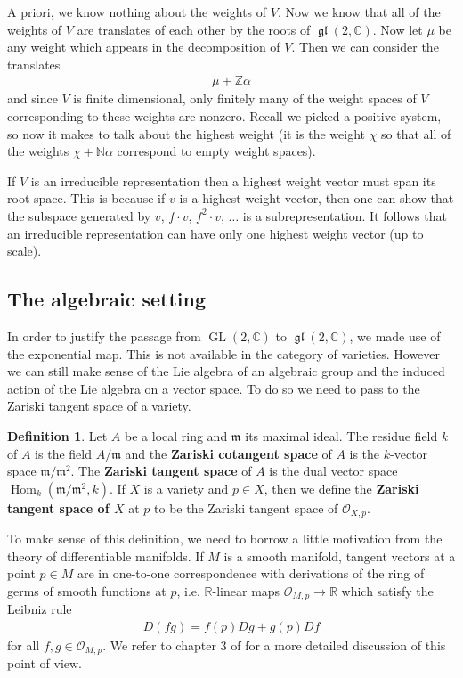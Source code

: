\documentclass{amsart}
\newcommand{\cO}{{\mathcal{O}}}
\DeclareMathOperator{\Hom}{Hom}
\DeclareMathOperator{\GL}{GL}
\newcommand{\C}{\mathbb{C}}
\newcommand{\N}{\mathbb{N}}
\newcommand{\R}{\mathbb{R}}
\newcommand{\Z}{\mathbb{Z}}
\newcommand{\mf}[1]{\mathfrak{#1}}
\DeclareMathOperator{\gl}{\mf{gl}}
\numberwithin{equation}{section}
\theoremstyle{plain} %
\theoremstyle{definition}
\newtheorem{definition}[equation]{Definition}
\theoremstyle{remark}
\begin{document}
A priori, we know nothing about the weights of $V$. Now we know that all of the weights of $V$ are translates of each other by the roots of
$\gl(2,\C)$. Now let $\mu$ be any weight which appears in the decomposition of $V$. Then we can consider the translates \begin{align*}
	\mu + \Z\alpha
\end{align*} and since $V$ is finite dimensional, only finitely many of the weight spaces of $V$ corresponding to these weights are nonzero.
Recall we picked a positive system, so now it makes to talk about the highest weight (it is the weight $\chi$ so that all of the weights $\chi + \N\alpha$
correspond to empty weight spaces).

\hfill

If $V$ is an irreducible representation then a highest weight vector must span its root space. This is because
if $v$ is a highest weight vector, then one can show that the subspace generated by $v$, $f\cdot v$, $f^2\cdot v$, $\ldots$ is a subrepresentation.
It follows that an irreducible representation can have only one highest weight vector (up to scale).

\subsection{The algebraic setting}
In order to justify the passage from $\GL(2,\C)$ to $\gl(2,\C)$, we made use of the exponential map.
This is not available in the category of varieties. However we can still make sense of the Lie algebra of an algebraic group
and the induced action of the Lie algebra on a vector space.
To do so we need to pass to the Zariski tangent space of a variety.

\begin{definition}
	Let $A$ be a local ring and $\mf m$ its maximal ideal. The residue field $k$ of $A$ is the field $A/\mf m$ and
	the \textbf{Zariski cotangent space} of $A$ is the $k$-vector space $\mf m/\mf m^2$. The
	\textbf{Zariski tangent space} of $A$ is the dual vector space $\Hom_k(\mf m/\mf m^2,k)$.
	If $X$ is a variety and $p\in X$, then we define the \textbf{ Zariski tangent space of $X$ }at $p$
	to be the Zariski tangent space of $\cO_{X,p}$.
\end{definition}


To make sense of this definition, we need to borrow a little motivation from the theory of differentiable manifolds.
If $M$ is a smooth manifold, tangent vectors at a point $p\in M$ are in one-to-one correspondence
with derivations of the ring of germs of smooth functions at $p$, i.e. $\R$-linear maps $\cO_{M,p}\to \R$ which satisfy the Leibniz rule
\begin{align*}
	D(fg) = f(p)Dg + g(p)Df
\end{align*} for all $f,g\in \cO_{M,p}$. 
We refer to chapter 3 of \cite{lee} for a more detailed discussion of this point of view.
\end{document}
